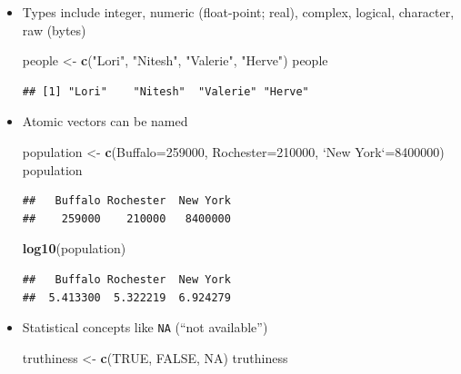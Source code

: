 \documentclass[]{article}
\newenvironment{Shaded}{\begin{snugshade}}{\end{snugshade}}
\newcommand{\KeywordTok}[1]{\textcolor[rgb]{0.13,0.29,0.53}{\textbf{#1}}}
\newcommand{\DataTypeTok}[1]{\textcolor[rgb]{0.13,0.29,0.53}{#1}}
\newcommand{\DecValTok}[1]{\textcolor[rgb]{0.00,0.00,0.81}{#1}}
\newcommand{\StringTok}[1]{\textcolor[rgb]{0.31,0.60,0.02}{#1}}
\newcommand{\OtherTok}[1]{\textcolor[rgb]{0.56,0.35,0.01}{#1}}
\newcommand{\NormalTok}[1]{#1}
\theoremstyle{definition}
\theoremstyle{definition}
\theoremstyle{remark}
\begin{document}
\begin{itemize}
\item
  Types include integer, numeric (float-point; real), complex, logical,
  character, raw (bytes)

\begin{Shaded}
\begin{Highlighting}[]
\NormalTok{people <-}\StringTok{ }\KeywordTok{c}\NormalTok{(}\StringTok{"Lori"}\NormalTok{, }\StringTok{"Nitesh"}\NormalTok{, }\StringTok{"Valerie"}\NormalTok{, }\StringTok{"Herve"}\NormalTok{)}
\NormalTok{people}
\end{Highlighting}
\end{Shaded}

\begin{verbatim}
## [1] "Lori"    "Nitesh"  "Valerie" "Herve"
\end{verbatim}
\item
  Atomic vectors can be named

\begin{Shaded}
\begin{Highlighting}[]
\NormalTok{population <-}\StringTok{ }\KeywordTok{c}\NormalTok{(}\DataTypeTok{Buffalo=}\DecValTok{259000}\NormalTok{, }\DataTypeTok{Rochester=}\DecValTok{210000}\NormalTok{, }\StringTok{`}\DataTypeTok{New York}\StringTok{`}\NormalTok{=}\DecValTok{8400000}\NormalTok{)}
\NormalTok{population}
\end{Highlighting}
\end{Shaded}

\begin{verbatim}
##   Buffalo Rochester  New York 
##    259000    210000   8400000
\end{verbatim}

\begin{Shaded}
\begin{Highlighting}[]
\KeywordTok{log10}\NormalTok{(population)}
\end{Highlighting}
\end{Shaded}

\begin{verbatim}
##   Buffalo Rochester  New York 
##  5.413300  5.322219  6.924279
\end{verbatim}
\item
  Statistical concepts like \texttt{NA} (``not available'')

\begin{Shaded}
\begin{Highlighting}[]
\NormalTok{truthiness <-}\StringTok{ }\KeywordTok{c}\NormalTok{(}\OtherTok{TRUE}\NormalTok{, }\OtherTok{FALSE}\NormalTok{, }\OtherTok{NA}\NormalTok{)}
\NormalTok{truthiness}
\end{Highlighting}
\end{Shaded}


\end{itemize}
\end{document}
